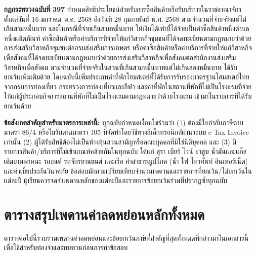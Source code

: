 \documentclass[12pt,a4paper]{article}
\newcommand{\hilight}[1]{\textbf{#1}}
\begin{document}
\textbf{กฎกระทรวงฉบับที่ 397} กำหนดสิทธิประโยชน์สำหรับการซื้อสินค้าหรือรับบริการในราชอาณาจักรตั้งแต่วันที่ 16 มกราคม พ.ศ. 2568 ถึงวันที่ 28 กุมภาพันธ์ พ.ศ. 2568 ตามจำนวนที่จ่ายจริงแต่ไม่เกินสามหมื่นบาท และในกรณีที่จ่ายเกินสามหมื่นบาท ให้เงินได้เท่าที่ได้จ่ายเป็นค่าซื้อสินค้าหนึ่งตำบลหนึ่งผลิตภัณฑ์ ค่าซื้อสินค้าหรือค่าบริการที่จ่ายให้แก่วิสาหกิจชุมชนที่ได้จดทะเบียนตามกฎหมายว่าด้วยการส่งเสริมวิสาหกิจชุมชนต่อกรมส่งเสริมการเกษตร หรือค่าซื้อสินค้าหรือค่าบริการที่จ่ายให้แก่วิสาหกิจเพื่อสังคมที่ได้จดทะเบียนตามกฎหมายว่าด้วยการส่งเสริมวิสาหกิจเพื่อสังคมต่อสำนักงานส่งเสริมวิสาหกิจเพื่อสังคม ตามจำนวนที่จ่ายจริงในส่วนที่เกินสามหมื่นบาทแต่ไม่เกินสองหมื่นบาท ได้รับยกเว้นเพิ่มเติมด้วย โดยฉบับนี้เพิ่มประเภทค่าที่พักโฮมสเตย์ที่ได้รับการรับรองมาตรฐานโฮมสเตย์ไทยจากกรมการท่องเที่ยว กระทรวงการท่องเที่ยวและกีฬา และค่าที่พักในสถานที่พักที่ไม่เป็นโรงแรมที่จ่ายให้แก่ผู้ประกอบกิจการสถานที่พักที่ไม่เป็นโรงแรมตามกฎหมายว่าด้วยโรงแรม เข้ามาในรายการที่ได้รับยกเว้นด้วย

\hilight{ข้อสังเกตสำคัญสำหรับมาตรการเหล่านี้:} ทุกฉบับกำหนดเงื่อนไขร่วมว่า (1) ต้องมีใบกำกับภาษีตามมาตรา 86/4 หรือใบรับตามมาตรา 105 ที่จัดทำโดยวิธีทางอิเล็กทรอนิกส์ผ่านระบบ e-Tax Invoice เท่านั้น (2) ผู้ได้รับสิทธิต้องไม่เป็นห้างหุ้นส่วนสามัญหรือคณะบุคคลที่มิใช่นิติบุคคล และ (3) มีรายการสินค้า/บริการที่ไม่เข้าเกณฑ์คล้ายกันในทุกฉบับ ได้แก่ สุรา เบียร์ ไวน์ ยาสูบ น้ำมันและแก๊สเติมยานพาหนะ รถยนต์ รถจักรยานยนต์ และเรือ ค่าสาธารณูปโภค (น้ำ ไฟ โทรศัพท์ อินเทอร์เน็ต) และค่าเบี้ยประกันวินาศภัย ข้อสอบมักถามเปรียบเทียบจำนวนเพดานและรายการที่ยกเว้น/ไม่ยกเว้นในแต่ละปี ผู้เรียนควรจดจำเพดานหลักของแต่ละปีและรายการข้อยกเว้นร่วมที่ปรากฏซ้ำทุกฉบับ

\newpage
\section{ตารางสรุปเพดานค่าลดหย่อนหลักทั้งหมด}

ตารางต่อไปนี้รวบรวมเพดานค่าลดหย่อนและข้อยกเว้นภาษีที่สำคัญที่สุดทั้งหมดที่กล่าวมาในเอกสารนี้ เพื่อใช้สำหรับท่องจำและทบทวนก่อนการทำข้อสอบ
\end{document}
